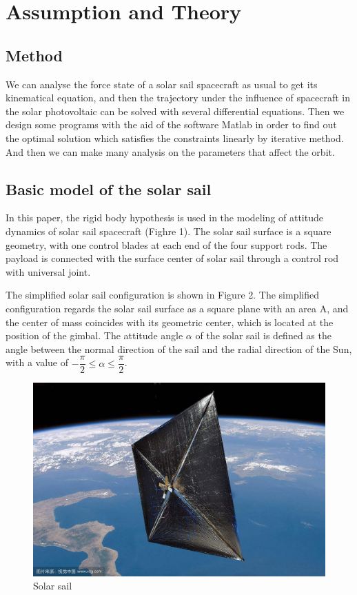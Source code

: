 \documentclass[../Paper.tex]{subfiles}
\begin{document}
\section{Assumption and Theory}

\subsection{Method}

We can analyse the force state of a solar sail spacecraft as usual to get its kinematical equation, and then the trajectory under the influence of spacecraft in the solar photovoltaic can be solved with several differential equations. Then we design some programs with the aid of the software Matlab in order to find out the optimal solution which satisfies the constraints linearly by iterative method. And then we can make many analysis on the parameters that affect the orbit.

\subsection{Basic model of the solar sail}

In this paper, the rigid body hypothesis is used in the modeling of attitude dynamics of solar sail spacecraft (Fighre 1). The solar sail surface is a square geometry, with one control blades at each end of the four support rods. The payload is connected with the surface center of solar sail through a control rod with universal joint.

The simplified solar sail configuration is shown in Figure 2. The simplified configuration regards the solar sail surface as a square plane with an area A, and the center of mass coincides with its geometric center, which is located at the position of the gimbal. The attitude angle $\alpha$ of the solar sail is defined as the angle between the normal direction of the sail and the radial direction of the Sun, with a value of $-\dfrac{\pi}{2}\leq\alpha\leq\dfrac{\pi}{2}$. 

\begin{figure}[H]
 \centering
 \includegraphics[scale=0.2]{../Figures/solarsailmodel.jpg}
 \caption{Solar sail}
\end{figure}
\end{document}
